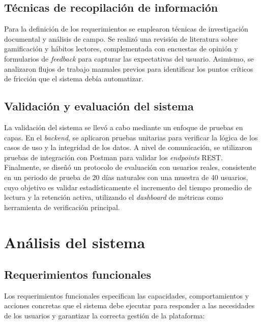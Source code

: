 \documentclass[12pt, atypical, journal]{article}
\begin{document}
\subsection{Técnicas de recopilación de información}
Para la definición de los requerimientos se emplearon técnicas de investigación documental y análisis de campo. Se realizó una revisión de literatura sobre gamificación y hábitos lectores, complementada con encuestas de opinión y formularios de \textit{feedback} para capturar las expectativas del usuario. Asimismo, se analizaron flujos de trabajo manuales previos para identificar los puntos críticos de fricción que el sistema debía automatizar.

\subsection{Validación y evaluación del sistema}
La validación del sistema se llevó a cabo mediante un enfoque de pruebas en capas. En el \textit{backend}, se aplicaron pruebas unitarias para verificar la lógica de los casos de uso y la integridad de los datos. A nivel de comunicación, se utilizaron pruebas de integración con Postman para validar los \textit{endpoints} REST. Finalmente, se diseñó un protocolo de evaluación con usuarios reales, consistente en un periodo de prueba de 20 días naturales con una muestra de 40 usuarios, cuyo objetivo es validar estadísticamente el incremento del tiempo promedio de lectura y la retención activa, utilizando el \textit{dashboard} de métricas como herramienta de verificación principal.

\newpage
\section{Análisis del sistema}

\subsection{Requerimientos funcionales}
Los requerimientos funcionales especifican las capacidades, comportamientos y acciones concretas que el sistema debe ejecutar para responder a las necesidades de los usuarios y garantizar la correcta gestión de la plataforma:
\end{document}
